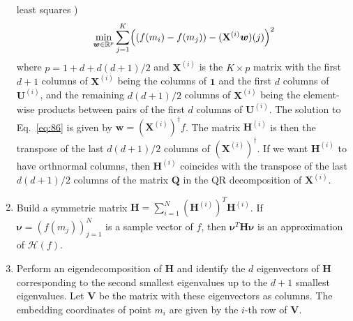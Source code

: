 \begin{enumerate}
  least squares \citep{kim09:_semi_regres_hessian})
  \begin{equation}
    \label{eq:86}
    \min_{\bm{w} \in \mathbb{R}^{p}} \sum_{j=1}^{K} \Bigl( (f(m_i) -
    f(m_j)) - (\mathbf{X}^{(i)} \bm{w})(j)\Bigr)^2
  \end{equation}
  where $p = 1 + d + d(d+1)/2$ and $\mathbf{X}^{(i)}$ is the $K \times
  p$ matrix with the first $d+1$ columns of $\mathbf{X}^{(i)}$ being
  the columns of $\bm{1}$ and the first $d$ columns of
  $\mathbf{U}^{(i)}$, and the remaining $d(d+1)/2$ columns of
  $\mathbf{X}^{(i)}$ being the element-wise products between pairs of
  the first $d$ columns of $\mathbf{U}^{(i)}$. The solution to
  Eq.~\eqref{eq:86} is given by $\bm{w} =
  (\mathbf{X}^{(i)})^{\dagger}f$. The matrix $\mathbf{H}^{(i)}$ is
  then the transpose of the last $d(d+1)/2$ columns of
  $(\mathbf{X}^{(i)}  )^{\dagger}$. If we want $\mathbf{H}^{(i)}$ to
  have orthnormal columns, then $\mathbf{H}^{(i)}$ coincides with the
  transpose of the last $d(d+1)/2$ columns of the matrix $\mathbf{Q}$
  in the QR decomposition of $\mathbf{X}^{(i)}$.
\item Build a symmetric matrix $\mathbf{H} =
  \sum_{i=1}^{N}{(\mathbf{H}^{(i)})^{T}\mathbf{H}^{(i)}}$. If
  $\bm{\nu} = (f(m_j))_{j=1}^{N}$ is a sample vector of $f$, then
  $\bm{\nu}^{T} \mathbf{H} \bm{\nu}$ is an approximation of
  $\mathcal{H}(f)$. 
\item Perform an eigendecomposition of $\mathbf{H}$ and identify the
  $d$ eigenvectors of $\mathbf{H}$ corresponding to the second
  smallest eigenvalues up to the $d+1$ smallest eigenvalues. Let
  $\mathbf{V}$ be the matrix with these eigenvectors as columns. The
  embedding coordinates of point $m_i$ are given by the $i$-th row of
  $\mathbf{V}$.
\end{enumerate}

